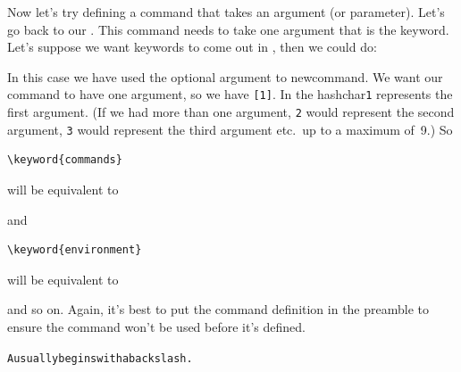 \label{sec:newcomarg}%
Now let's try defining a command that takes an \gls{argument} (or
parameter).  Let's go back to our .  This
command needs to take one argument that is the keyword.  Let's
suppose we want keywords to come out in
, then we could do:
\begin{codeS}
\end{codeS}%
In this case we have used the optional argument  to
\gls{newcommand}.  We want our command  to have
one argument, so we have \texttt{[1]}.  In \texttt{} the
\gls{hashchar}\texttt{1} represents the first argument.  (If we had
more than one argument, \texttt{2} would represent the second
argument, \texttt{3} would represent the third argument etc.\ up to a
maximum of~9.) So
\begin{verbatim}
\keyword{commands}
\end{verbatim}
will be equivalent to 
\begin{alltt}
\end{alltt}
and
\begin{verbatim}
\keyword{environment}
\end{verbatim}
will be equivalent to
\begin{alltt}
\end{alltt}
and so on.
Again, it's best to put the command definition in the preamble to
ensure the command won't be used before it's defined.

\begin{code}
\begin{alltt}



A  usually begins with a backslash.

\end{alltt}
\end{code}

